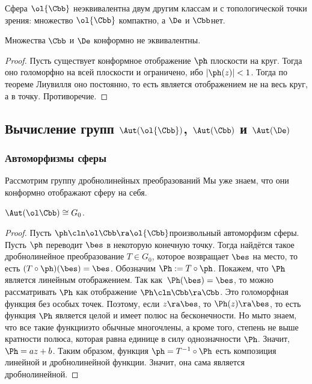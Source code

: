 \documentclass[a4paper]{article}
\begin{document}
\begin{note}
Сфера $\ol{\Cbb}$ неэквивалентна двум другим классам и с топологической точки зрения:
множество $\ol{\Cbb}$ компактно, а $\De$ и $\Cbb$\т нет.
\end{note}

\begin{stm}
Множества $\Cbb$ и $\De$ конформно не эквивалентны.
\end{stm}
\begin{proof}
Пусть существует конформное отображение $\ph$ плоскости на круг. Тогда оно голоморфно на всей плоскости и ограничено,
ибо $|\ph(z)|<1$. Тогда по теореме Лиувилля оно постоянно, то есть является отображением не на весь круг, а в точку.
Противоречие.
\end{proof}

\subsection{Вычисление групп $\Aut(\ol{\Cbb})$, $\Aut(\Cbb)$ и $\Aut(\De)$}

\subsubsection{Автоморфизмы сферы}

Рассмотрим группу дробно\д линейных преобразований
Мы уже знаем, что они конформно отображают сферу на себя.

\begin{theorem}
$\Aut(\ol\Cbb) \cong G_0$.
\end{theorem}
\begin{proof}
Пусть $\ph\cln\ol\Cbb\ra\ol{\Cbb}$\т произвольный автоморфизм сферы. Пусть $\ph$ переводит $\bes$
в некоторую конечную точку. Тогда найдётся такое дробно\д линейное преобразование $T \in G_0$, которое возвращает $\bes$
на место, то есть $(T\circ \ph)(\bes)=\bes$. Обозначим $\Ph := T \circ \ph$. Покажем, что $\Ph$ является линейным
отображением. Так как~$\Ph(\bes)=\bes$, то можно рассматривать $\Ph$ как отображение $\Ph\cln\Cbb\ra \Cbb$.
Это голоморфная функция без особых точек. Поэтому, если $z\ra\bes$, то $\Ph(z)\ra\bes$, то есть функция $\Ph$ является
целой и имеет полюс на бесконечности. Но мы\д то знаем, что все такие функции\т это обычные многочлены, а кроме того,
степень не выше кратности полюса, которая равна единице в силу однозначности $\Ph$. Значит, $\Ph = az+b$.
Таким образом, функция $\ph = T^{-1}\circ \Ph$ есть композиция линейной и дробно\д линейной функции. Значит, она сама
является дробно\д линейной.
\end{proof}
\end{document}
